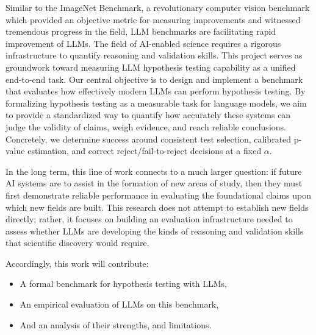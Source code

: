 \documentclass{article}
\begin{document}
Similar to the ImageNet Benchmark, a revolutionary computer vision benchmark which provided an objective metric for measuring improvements and witnessed tremendous progress in the field, LLM benchmarks are facilitating rapid improvement of LLMs. The field of AI-enabled science requires a rigorous infrastructure to quantify reasoning and validation skills\cite{russakovsky2015imagenet}. This project serves as groundwork toward measuring LLM hypothesis testing capability as a unified end-to-end task. Our central objective is to design and implement a benchmark that evaluates how effectively modern LLMs can perform hypothesis testing. By formalizing hypothesis testing as a measurable task for language models, we aim to provide a standardized way to quantify how accurately these systems can judge the validity of claims, weigh evidence, and reach reliable conclusions. Concretely, we determine success around consistent test selection, calibrated p-value estimation, and correct reject/fail-to-reject decisions at a fixed $\alpha$.

In the long term, this line of work connects to a much larger question: if future AI systems are to assist in the formation of new areas of study, then they must first demonstrate reliable performance in evaluating the foundational claims upon which new fields are built. This research does not attempt to establish new fields directly; rather, it focuses on building an evaluation infrastructure needed to assess whether LLMs are developing the kinds of reasoning and validation skills that scientific discovery would require.

Accordingly, this work will contribute:
\begin{itemize}
    \item A formal benchmark for hypothesis testing with LLMs,
    \item An empirical evaluation of LLMs on this benchmark,
    \item And an analysis of their strengths, and limitations.
\end{itemize}
\end{document}
